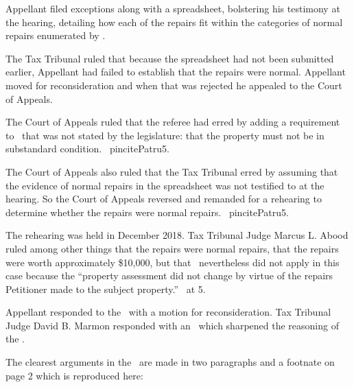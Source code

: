 \documentclass[12pt,\documentclassflag]{michiganCourtOfAppealsBrief}
\def\mathieuGast{\pincite[l]{MCL}{211.27(2)}}
\begin{document}
Appellant filed exceptions along with a spreadsheet, bolstering his testimony at the hearing, detailing how each of the repairs fit within the categories of normal repairs enumerated by \mathieuGast. 

The Tax Tribunal ruled that because the spreadsheet had not been submitted earlier, Appellant had failed to establish that the repairs were normal. Appellant moved for reconsideration and when that was rejected he appealed to the Court of Appeals.

The Court of Appeals ruled that the referee had erred by adding a requirement to \mathieuGast\ that was not stated by the legislature: that the property must not be in substandard condition. \ pincite{Patru}{5}.

The Court of Appeals also ruled that the Tax Tribunal erred by assuming that the evidence of normal repairs in the spreadsheet was not testified to at the hearing. So the Court of Appeals reversed and remanded for a rehearing to determine whether the repairs were normal repairs. \ pincite{Patru}{5}.

The rehearing was held in December 2018. Tax Tribunal Judge Marcus L. Abood ruled among other things that the repairs were normal repairs, that the repairs were worth approximately \$10,000, but that \mathieuGast\ nevertheless did not apply in this case because the ``property assessment did not change by virtue of the repairs Petitioner made to the subject property.'' \FOJ\ at 5.

Appellant responded to the \FOJ\ with a motion for reconsideration. Tax Tribunal Judge David B. Marmon responded with an \orderDenying\ which sharpened the reasoning of the \FOJ. 

The clearest arguments in the \orderDenying\ are made in two paragraphs and a footnate on page 2 which is reproduced here:
\end{document}
